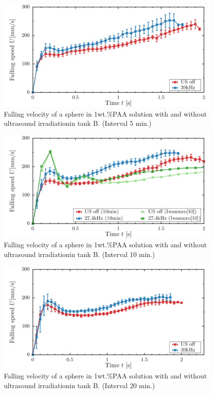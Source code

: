 \begin{figure}[ht]
    \centering
    \includegraphics[width=12cm,clip]{./4-Results/s1-5.png}
    \caption{Falling velocity of a sphere in 1wt.\%PAA solution with and without ultrasound irradiationin tank B. (Interval 5 min.)}
    \label{fig:falling-5}
\end{figure}
\begin{figure}[ht]
    \centering
    \includegraphics[width=12cm,clip]{./4-Results/s1-10.png}
    \caption{Falling velocity of a sphere in 1wt.\%PAA solution with and without ultrasound irradiationin tank B. (Interval 10 min.)}
    \label{fig:falling-10}
\end{figure}
\begin{figure}[ht]
    \centering
    \includegraphics[width=12cm,clip]{./4-Results/s1-20.png}
    \caption{Falling velocity of a sphere in 1wt.\%PAA solution with and without ultrasound irradiationin tank B. (Interval 20 min.)}
    \label{fig:falling-20}
\end{figure}

\clearpage
